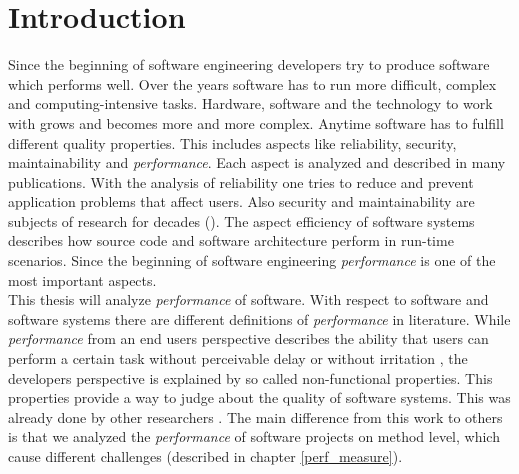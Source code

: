 \chapter{Introduction}
\label{chap:introduction}

Since the beginning of software engineering developers try to produce software which performs well. Over the years software has to run more difficult, complex and computing-intensive tasks. Hardware, software and the technology to work with grows and becomes more and more complex. Anytime software has to fulfill different quality properties. This includes aspects like reliability, security, maintainability and \textit{performance}. Each aspect is analyzed and described in many publications. With the analysis of reliability one tries to reduce and prevent application problems that affect users. Also security and maintainability are subjects of research for decades (\cite{liskov1972design,johnstone1978computer,yau1980some}). The aspect efficiency of software systems describes how source code and software architecture perform in run-time scenarios. Since the beginning of software engineering \textit{performance} is one of the most important aspects.\\
This thesis will analyze \textit{performance} of software. With respect to software and software systems there are different definitions of \textit{performance} in literature. While \textit{performance} from an end users perspective describes the ability that users can perform a certain task without perceivable delay or without irritation \cite{Molyneaux:2009:AAP:1550832}, the developers perspective is explained by so called non-functional properties. This properties provide a way to judge about the quality of software systems. This was already done by other researchers \cite{Molyneaux:2009:AAP:1550832,weber2005key,siegmund2015performance,smith1993software}. The main difference from this work to others is that we analyzed the \textit{performance} of software projects on method level, which cause different challenges (described in chapter \ref{perf_measure}).\\
